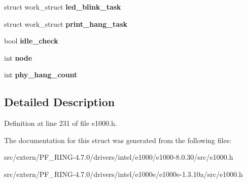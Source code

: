 \begin{DoxyCompactItemize}
\item 
\hypertarget{structe1000__adapter_a5f0da7b091732f5dd9e350c3e0b9c4c9}{
struct work\_\-struct {\bfseries led\_\-blink\_\-task}}
\label{structe1000__adapter_a5f0da7b091732f5dd9e350c3e0b9c4c9}

\item 
\hypertarget{structe1000__adapter_a5e3122f10a09e7dd421554e53e8de619}{
struct work\_\-struct {\bfseries print\_\-hang\_\-task}}
\label{structe1000__adapter_a5e3122f10a09e7dd421554e53e8de619}

\item 
\hypertarget{structe1000__adapter_a4aa9d182da3b851007c12330ba5d3433}{
bool {\bfseries idle\_\-check}}
\label{structe1000__adapter_a4aa9d182da3b851007c12330ba5d3433}

\item 
\hypertarget{structe1000__adapter_a23194da683299c3e936656af49c9fe92}{
int {\bfseries node}}
\label{structe1000__adapter_a23194da683299c3e936656af49c9fe92}

\item 
\hypertarget{structe1000__adapter_a0c1f5c7b9f759759efac06960a911153}{
int {\bfseries phy\_\-hang\_\-count}}
\label{structe1000__adapter_a0c1f5c7b9f759759efac06960a911153}

\end{DoxyCompactItemize}


\subsection{Detailed Description}


Definition at line 231 of file e1000.h.



The documentation for this struct was generated from the following files:\begin{DoxyCompactItemize}
\item 
src/extern/PF\_\-RING-\/4.7.0/drivers/intel/e1000/e1000-\/8.0.30/src/e1000.h\item 
src/extern/PF\_\-RING-\/4.7.0/drivers/intel/e1000e/e1000e-\/1.3.10a/src/e1000.h\end{DoxyCompactItemize}
